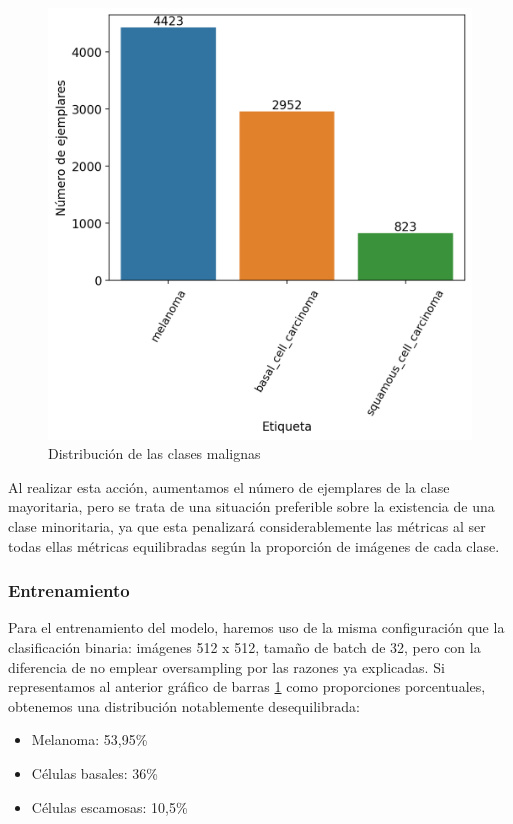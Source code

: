 \begin{figure}[H]
	\centering
	\includegraphics[scale = 0.6]{imagenes/countmalignant.png}
	\caption{Distribución de las clases malignas}
	\label {fig:malas}
\end{figure}


Al realizar esta acción, aumentamos el número de ejemplares de la clase mayoritaria, pero se trata de una situación preferible sobre la existencia de una clase minoritaria, ya que esta penalizará considerablemente las métricas al ser todas ellas métricas equilibradas según la proporción de imágenes de cada clase.

\subsubsection{Entrenamiento}

Para el entrenamiento del modelo, haremos uso de la misma configuración que la clasificación binaria: imágenes 512 x 512, tamaño de batch de 32, pero con la diferencia de no emplear oversampling por las razones ya explicadas. Si representamos al anterior gráfico de barras \ref{fig:malas} como proporciones porcentuales, obtenemos una distribución notablemente desequilibrada:

\begin{itemize}
	\item Melanoma: 53,95\%
	\item Células basales: 36\%
	\item Células escamosas: 10,5\%
 \end{itemize}
 
